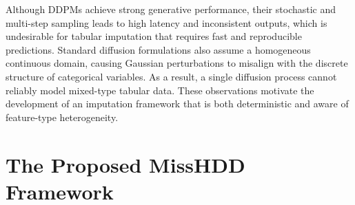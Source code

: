 \documentclass[times, review, 10pt]{elsarticle}
\begin{document}
Although DDPMs achieve strong generative performance, their stochastic and
multi-step sampling leads to high latency and inconsistent outputs, which is
undesirable for tabular imputation that requires fast and reproducible
predictions. Standard diffusion formulations also assume a homogeneous
continuous domain, causing Gaussian perturbations to misalign with the
discrete structure of categorical variables. As a result, a single diffusion
process cannot reliably model mixed-type tabular data. These observations
motivate the development of an imputation framework that is both
deterministic and aware of feature-type heterogeneity.





\section{The Proposed MissHDD Framework}
\end{document}
